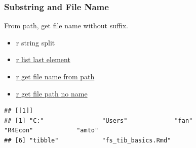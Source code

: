 \documentclass[
]{book}
\newenvironment{Shaded}{\begin{snugshade}}{\end{snugshade}}
\newcommand{\AttributeTok}[1]{\textcolor[rgb]{0.77,0.63,0.00}{#1}}
\newcommand{\DecValTok}[1]{\textcolor[rgb]{0.00,0.00,0.81}{#1}}
\newcommand{\FunctionTok}[1]{\textcolor[rgb]{0.00,0.00,0.00}{#1}}
\newcommand{\NormalTok}[1]{#1}
\newcommand{\OtherTok}[1]{\textcolor[rgb]{0.56,0.35,0.01}{#1}}
\newcommand{\SpecialCharTok}[1]{\textcolor[rgb]{0.00,0.00,0.00}{#1}}
\newcommand{\StringTok}[1]{\textcolor[rgb]{0.31,0.60,0.02}{#1}}
\providecommand{\tightlist}{%
  \setlength{\itemsep}{0pt}\setlength{\parskip}{0pt}}
\begin{document}
\hypertarget{substring-and-file-name}{%
\subsubsection{Substring and File Name}\label{substring-and-file-name}}

From path, get file name without suffix.

\begin{itemize}
\tightlist
\item
  r string split
\item
  \href{https://stackoverflow.com/a/83222/8280804}{r list last element}
\item
  \href{https://stackoverflow.com/a/29114007/8280804}{r get file name from path}
\item
  \href{https://stackoverflow.com/a/47189541/8280804}{r get file path no name}
\end{itemize}

\begin{Shaded}
\end{Shaded}

\begin{verbatim}
## [[1]]
## [1] "C:"                "Users"             "fan"               "R4Econ"            "amto"             
## [6] "tibble"            "fs_tib_basics.Rmd"
\end{verbatim}
\end{document}
